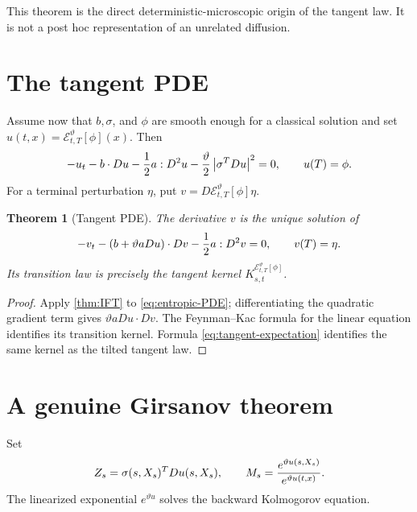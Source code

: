 \documentclass[11pt,reqno]{amsart}
\newtheorem{theorem}{Theorem}[section]
\theoremstyle{definition}
\theoremstyle{remark}
\newcommand{\cE}{\mathcal E}
\newcommand{\abs}[1]{\left\lvert #1\right\rvert}
\begin{document}
This theorem is the direct deterministic-microscopic origin of the tangent
law.  It is not a post hoc representation of an unrelated diffusion.

\section{The tangent PDE}

Assume now that $b,\sigma$, and $\phi$ are smooth enough for a classical
solution and set
$u(t,x)=\cE_{t,T}^{\vartheta}[\phi](x)$.  Then
\begin{equation}\label{eq:entropic-PDE}
 -u_t-b\cdot Du-{1\over2}a:D^2u
 -{\vartheta\over2}\abs{\sigma^TDu}^2=0,
 \qquad u(T)=\phi.
\end{equation}
For a terminal perturbation $\eta$, put
$v=D\cE_{t,T}^{\vartheta}[\phi]\eta$.

\begin{theorem}[Tangent PDE]\label{thm:tangent-PDE}
The derivative $v$ is the unique solution of
\begin{equation}\label{eq:tangent-PDE}
 -v_t-\left(b+\vartheta aDu\right)\cdot Dv
 -{1\over2}a:D^2v=0,
 \qquad v(T)=\eta.
\end{equation}
Its transition law is precisely the tangent kernel
$K_{s,t}^{\cE_{t,T}^{\vartheta}[\phi]}$.
\end{theorem}

\begin{proof}
Apply \cref{thm:IFT} to \eqref{eq:entropic-PDE}; differentiating the quadratic
gradient term gives $\vartheta aDu\cdot Dv$.  The Feynman--Kac formula for the
linear equation identifies its transition kernel.  Formula
\eqref{eq:tangent-expectation} identifies the same kernel as the tilted
tangent law.
\end{proof}

\section{A genuine Girsanov theorem}

Set
\[
 Z_s=\sigma(s,X_s)^TDu(s,X_s),
 \qquad
 M_s={e^{\vartheta u(s,X_s)}
 \over e^{\vartheta u(t,x)}}.
\]
The linearized exponential $e^{\vartheta u}$ solves the backward Kolmogorov
equation.
\end{document}
